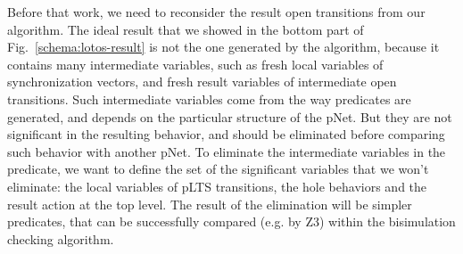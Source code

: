 \documentclass{lncs/llncs}
\begin{document}
Before that work, we need to reconsider the result open transitions
from our algorithm. The ideal
result that we showed in the bottom part of
Fig.~\ref{schema:lotos-result} is not the one generated by the algorithm,
because it contains many intermediate
variables, such as fresh local variables of synchronization
vectors, and fresh result variables of intermediate open transitions.
Such intermediate variables come from the way predicates are
generated, and depends on the particular structure of the pNet. But
they are not significant in the resulting behavior, and should be
eliminated before comparing such behavior with another pNet.
To eliminate the intermediate variables in the predicate, we want to define
the set of the significant variables that we won't eliminate: the
local variables of pLTS transitions, the hole behaviors and the result
action at the top level.
The result of the elimination will be simpler predicates, that can be
successfully compared (e.g. by Z3) within the bisimulation checking
algorithm.





% 


\end{document}
